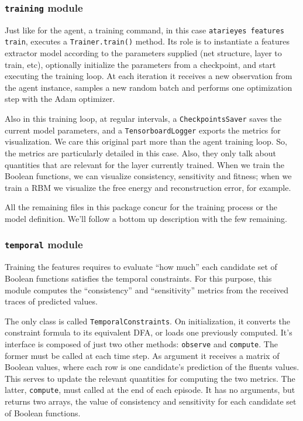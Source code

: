 \subsubsection*{\texttt{training} module}

Just like for the agent, a training command, in this case
\verb|atarieyes features train|, executes a \verb|Trainer.train()| method.
Its role is to instantiate a features extractor model according to the
parameters supplied (net structure, layer to train, etc), optionally
initialize the parameters from a checkpoint, and start executing the training
loop.  At each iteration it receives a new observation from the agent
instance, samples a new random batch and performs one optimization step with
the Adam optimizer.

Also in this training loop, at regular intervals, a \texttt{CheckpointsSaver}
saves the current model parameters, and a \texttt{TensorboardLogger} exports
the metrics for visualization. We care this original part more than the agent
training loop. So, the metrics are particularly detailed in this case. Also,
they only talk about quantities that are relevant for the layer currently
trained. When we train the Boolean functions, we can visualize consistency,
sensitivity and fitness; when we train a RBM we visualize the free energy and
reconstruction error, for example.

All the remaining files in this package concur for the training process or the
model definition. We'll follow a bottom up description with the few remaining.


\subsubsection*{\texttt{temporal} module}

Training the features requires to evaluate ``how much'' each candidate set of
Boolean functions satisfies the temporal constraints. For this purpose, this
module computes the ``consistency'' and ``sensitivity'' metrics from the
received traces of predicted values.

The only class is called \texttt{TemporalConstraints}. On initialization, it
converts the constraint formula to its equivalent DFA, or loads one previously
computed. It's interface is composed of just two other methods:
\texttt{observe} and \texttt{compute}. The former must be called at each time
step. As argument it receives a matrix of Boolean values, where each row is
one candidate's prediction of the fluents values. This serves to update the
relevant quantities for computing the two metrics. The latter,
\texttt{compute}, must called at the end of each episode. It has no arguments,
but returns two arrays, the value of consistency and sensitivity for each
candidate set of Boolean functions.

